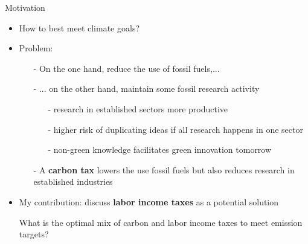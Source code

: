 \documentclass[11pt,aspectratio=169]{beamer}
\begin{document}
\addtocounter{framenumber}{-1}
\begin{frame}{Motivation}
	\begin{itemize}[<+-| alert@+>]
		\item How to best meet climate goals? %
		\vspace{3mm}
		\item Problem:
		\begin{itemize}
			\item[-] On the one hand,  reduce the use of fossil fuels,...
			\vspace{2mm}
			\item[-] ... on the other hand, maintain some fossil research activity
			\begin{enumerate}
				\item[-] research in established sectors more productive
				\item[-] higher risk of duplicating ideas if all research happens in one sector
				\item[-] non-green knowledge facilitates green innovation tomorrow %
			\end{enumerate}%
			\vspace{2mm}				
			\item[-] A \textbf{carbon tax} lowers the use fossil fuels but also reduces research in established industries %
		\end{itemize} 
		\vspace{3mm}
		\item My contribution: discuss \textbf{labor income taxes} as a potential solution
		\vspace{3mm}
		\item[] \hspace{-4mm}\alert{{What is the optimal mix of carbon and labor income taxes to meet emission targets?}}
	\end{itemize}
\end{frame}
\end{document}
